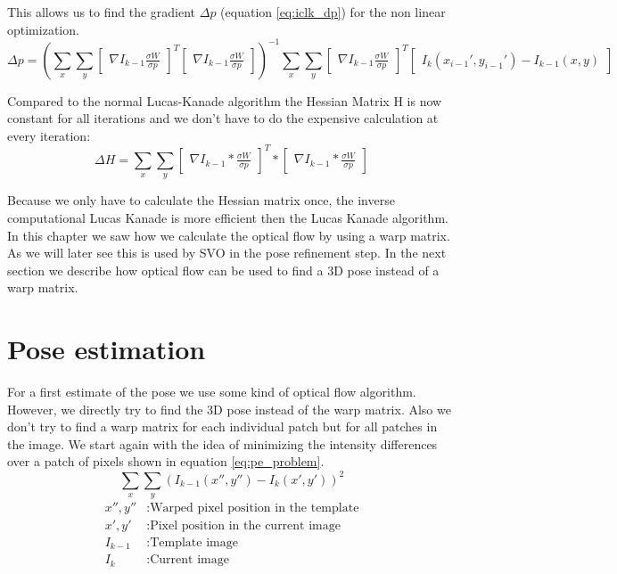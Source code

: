 \documentclass[11pt,a4paper,titlepage,oneside]{report}
\begin{document}
This allows us to find the gradient $\Delta p$ (equation \ref{eq:iclk_dp}) for the non linear optimization.
\tiny
\begin{equation}\label{eq:iclk_dp}
	\Delta p=(\sum_x\sum_y\begin{bmatrix}\nabla I_{k-1}\frac{\sigma W}{\sigma p}\end{bmatrix}^T\begin{bmatrix}\nabla I_{k-1}\frac{\sigma W}{\sigma p}\end{bmatrix})^{-1}
	\sum_x\sum_y\begin{bmatrix}\nabla I_{k-1}\frac{\sigma W}{\sigma p}\end{bmatrix}^T\begin{bmatrix}I_{k}(x_{i-1}',y_{i-1}') - I_{k-1}(x,y)\end{bmatrix}
\end{equation}
\normalsize

Compared to the normal Lucas-Kanade algorithm the Hessian Matrix H is now constant for all iterations and we don't have to do the expensive calculation at every iteration:
\begin{equation}
	\Delta H=\sum_x\sum_y\begin{bmatrix}\nabla I_{k-1}*\frac{\sigma W}{\sigma p}\end{bmatrix}^T*\begin{bmatrix}\nabla I_{k-1}*\frac{\sigma W}{\sigma p}\end{bmatrix}
\end{equation}

Because we only have to calculate the Hessian matrix once, the inverse computational Lucas Kanade is more efficient then the Lucas Kanade algorithm.\\
In this chapter we saw how we calculate the optical flow by using a warp matrix. As we will later see this is used by SVO in the pose refinement step. In the next section we describe how optical flow can be used to find a 3D pose instead of a warp matrix.

\section{Pose estimation}
For a first estimate of the pose we use some kind of optical flow algorithm. However, we directly try to find the 3D pose instead of the warp matrix. Also we don't try to find a warp matrix for each individual patch but for all patches in the image. We start again with the idea of minimizing the intensity differences over a patch of pixels shown in equation \ref{eq:pe_problem}.
\begin{equation}\label{eq:pe_problem}
	\sum_x\sum_y(I_{k-1}(x'',y'')-I_{k}(x',y'))^2
\end{equation}
\begin{align*}
	x'',y''		&:	\text{Warped pixel position in the template}\\
	x',y'			&:	\text{Pixel position in the current image}\\
	I_{k-1}				&:	\text{Template image}\\
	I_{k}					&:	\text{Current image}
\end{align*}
\end{document}
